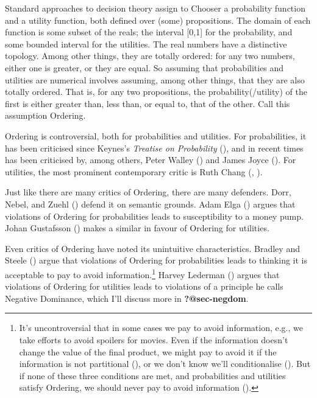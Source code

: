 \documentclass[
  10pt,
  letterpaper,
  DIV=11,
  numbers=noendperiod,
  twoside]{scrartcl}
\begin{document}
Standard approaches to decision theory assign to Chooser a probability
function and a utility function, both defined over (some) propositions.
The domain of each function is some subset of the reals; the interval
{[}0,1{]} for the probability, and some bounded interval for the
utilities. The real numbers have a distinctive topology. Among other
things, they are totally ordered: for any two numbers, either one is
greater, or they are equal. So assuming that probabilities and utilities
are numerical involves assuming, among other things, that they are also
totally ordered. That is, for any two propositions, the
probability(/utility) of the first is either greater than, less than, or
equal to, that of the other. Call this assumption Ordering.

Ordering is controversial, both for probabilities and utilities. For
probabilities, it has been criticised since Keynes's \emph{Treatise on
Probability} (), and in recent times has
been criticised by, among others, Peter Walley
() and James Joyce
(). For utilities, the most prominent
contemporary critic is Ruth Chang (,
).

Just like there are many critics of Ordering, there are many defenders.
Dorr, Nebel, and Zuehl () defend it on
semantic grounds. Adam Elga () argues that
violations of Ordering for probabilities leads to susceptibility to a
money pump. Johan Gustafsson () makes
a similar in favour of Ordering for utilities.

Even critics of Ordering have noted its unintuitive characteristics.
Bradley and Steele () argue that
violations of Ordering for probabilities leads to thinking it is
acceptable to pay to avoid information.\footnote{It's uncontroversial
  that in some cases we pay to avoid information, e.g., we take efforts
  to avoid spoilers for movies. Even if the information doesn't change
  the value of the final product, we might pay to avoid it if the
  information is not partitional (), or
  we don't know we'll conditionalise (). But if none of these three conditions are met, and
  probabilities and utilities satisfy Ordering, we should never pay to
  avoid information ().}
Harvey Lederman () argues that violations
of Ordering for utilities leads to violations of a principle he calls
Negative Dominance, which I'll discuss more in \textbf{?@sec-negdom}.
\end{document}
